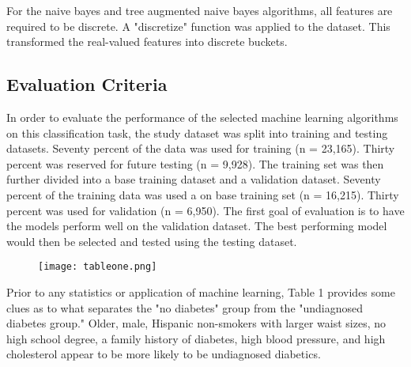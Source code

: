 \documentclass[twoside,11pt]{article}
\begin{document}
For the naive bayes and tree augmented naive bayes algorithms, all features are required to be discrete. A "discretize" function was applied to the dataset. This transformed the real-valued features into discrete buckets. 

\subsection{Evaluation Criteria}
In order to evaluate the performance of the selected machine learning algorithms on this classification task, the study dataset was split into training and testing datasets. Seventy percent of the data was used for training (n = 23,165). Thirty percent was reserved for future testing (n = 9,928). The training set was then further divided into a base training dataset and a validation dataset. Seventy percent of the training data was used a on base training set (n = 16,215). Thirty percent was used for validation (n = 6,950). The first goal of evaluation is to have the models perform well on the validation dataset. The best performing model would then be selected and tested using the testing dataset. 

\begin{figure}[htbp]
  \centering 
  \texttt{[image: tableone.png]} 
  \label{fig:1} 
\end{figure} 

Prior to any statistics or application of machine learning, Table 1 provides some clues as to what separates the "no diabetes" group from the "undiagnosed diabetes group." Older, male, Hispanic non-smokers with larger waist sizes, no high school degree, a family history of diabetes, high blood pressure, and high cholesterol appear to be more likely to be undiagnosed diabetics.  
\end{document}
